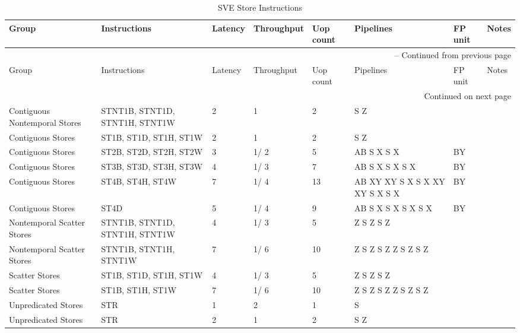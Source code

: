 \begin{longtable}{|p{1in}|p{1in}|l|l|l|p{1in}|l|p{1in}|}
\caption{SVE Store Instructions} \\
\hline
Group & Instructions & Latency & Throughput & Uop count & Pipelines & FP unit & Notes\\
\hline
\endfirsthead
\hline
\multicolumn{8}{|r|}{{\tablename\ \thetable{} -- Continued from previous page}} \\
\hline
Group & Instructions & Latency & Throughput & Uop count & Pipelines & FP unit & Notes\\
\hline
\endhead
\hline
\multicolumn{8}{|r|}{{Continued on next page}} \\
\hline
\endfoot
\hline
\endlastfoot
Contiguous Nontemporal Stores & STNT1B, STNT1D, STNT1H, STNT1W & 2 & 1 & 2 & S Z &  & \\
\hline
Contiguous Stores & ST1B, ST1D, ST1H, ST1W & 2 & 1 & 2 & S Z &  & \\
\hline
Contiguous Stores & ST2B, ST2D, ST2H, ST2W & 3 & 1/ 2 & 5 & AB S X S X & BY & \\
\hline
Contiguous Stores & ST3B, ST3D, ST3H, ST3W & 4 & 1/ 3 & 7 & AB S X S X S X & BY & \\
\hline
Contiguous Stores & ST4B, ST4H, ST4W & 7 & 1/ 4 & 13 & AB XY XY S X S X XY XY S X S X & BY & \\
\hline
Contiguous Stores & ST4D & 5 & 1/ 4 & 9 & AB S X S X S X S X & BY & \\
\hline
Nontemporal Scatter Stores & STNT1B, STNT1D, STNT1H, STNT1W & 4 & 1/ 3 & 5 & Z S Z S Z &  & \\
\hline
Nontemporal Scatter Stores & STNT1B, STNT1H, STNT1W & 7 & 1/ 6 & 10 & Z S Z S Z Z S Z S Z &  & \\
\hline
Scatter Stores & ST1B, ST1D, ST1H, ST1W & 4 & 1/ 3 & 5 & Z S Z S Z &  & \\
\hline
Scatter Stores & ST1B, ST1H, ST1W & 7 & 1/ 6 & 10 & Z S Z S Z Z S Z S Z &  & \\
\hline
Unpredicated Stores & STR & 1 & 2 & 1 & S &  & \\
\hline
Unpredicated Stores & STR & 2 & 1 & 2 & S Z &  & \\
\hline
\end{longtable}
